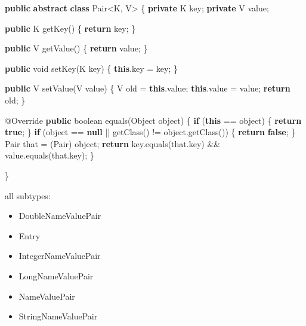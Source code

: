 \documentclass[
]{book}
\newenvironment{Shaded}{\begin{snugshade}}{\end{snugshade}}
\newcommand{\AttributeTok}[1]{\textcolor[rgb]{0.77,0.63,0.00}{#1}}
\newcommand{\BuiltInTok}[1]{#1}
\newcommand{\DataTypeTok}[1]{\textcolor[rgb]{0.13,0.29,0.53}{#1}}
\newcommand{\FunctionTok}[1]{\textcolor[rgb]{0.00,0.00,0.00}{#1}}
\newcommand{\KeywordTok}[1]{\textcolor[rgb]{0.13,0.29,0.53}{\textbf{#1}}}
\newcommand{\NormalTok}[1]{#1}
\providecommand{\tightlist}{%
  \setlength{\itemsep}{0pt}\setlength{\parskip}{0pt}}
\begin{document}
\begin{Shaded}
\begin{Highlighting}[]
\KeywordTok{public} \KeywordTok{abstract} \KeywordTok{class}\NormalTok{ Pair<K, V> \{}
    \KeywordTok{private}\NormalTok{ K key;}
    \KeywordTok{private}\NormalTok{ V value;}

    \KeywordTok{public}\NormalTok{ K }\FunctionTok{getKey}\NormalTok{() \{}
        \KeywordTok{return}\NormalTok{ key;}
\NormalTok{    \}}

    \KeywordTok{public}\NormalTok{ V }\FunctionTok{getValue}\NormalTok{() \{}
        \KeywordTok{return}\NormalTok{ value;}
\NormalTok{    \}}

    \KeywordTok{public} \DataTypeTok{void} \FunctionTok{setKey}\NormalTok{(K key) \{}
        \KeywordTok{this}\NormalTok{.}\FunctionTok{key}\NormalTok{ = key;}
\NormalTok{    \}}

    \KeywordTok{public}\NormalTok{ V }\FunctionTok{setValue}\NormalTok{(V value) \{}
\NormalTok{        V old = }\KeywordTok{this}\NormalTok{.}\FunctionTok{value}\NormalTok{;}
        \KeywordTok{this}\NormalTok{.}\FunctionTok{value}\NormalTok{ = value;}
        \KeywordTok{return}\NormalTok{ old;}
\NormalTok{    \}}


    \AttributeTok{@Override}
    \KeywordTok{public} \DataTypeTok{boolean} \FunctionTok{equals}\NormalTok{(}\BuiltInTok{Object}\NormalTok{ object) \{}
        \KeywordTok{if}\NormalTok{ (}\KeywordTok{this}\NormalTok{ == object) \{}
            \KeywordTok{return} \KeywordTok{true}\NormalTok{;}
\NormalTok{        \}}
        \KeywordTok{if}\NormalTok{ (object == }\KeywordTok{null}\NormalTok{ || }\FunctionTok{getClass}\NormalTok{() != object.}\FunctionTok{getClass}\NormalTok{()) \{}
            \KeywordTok{return} \KeywordTok{false}\NormalTok{;}
\NormalTok{        \}}
\NormalTok{        Pair that = (Pair) object;}
        \KeywordTok{return}\NormalTok{ key.}\FunctionTok{equals}\NormalTok{(that.}\FunctionTok{key}\NormalTok{) && value.}\FunctionTok{equals}\NormalTok{(that.}\FunctionTok{key}\NormalTok{);}
\NormalTok{    \}}

\NormalTok{\}}
\end{Highlighting}
\end{Shaded}

all subtypes:

\begin{itemize}
\tightlist
\item
  DoubleNameValuePair
\item
  Entry
\item
  IntegerNameValuePair
\item
  LongNameValuePair
\item
  NameValuePair
\item
  StringNameValuePair
\end{itemize}
\end{document}
